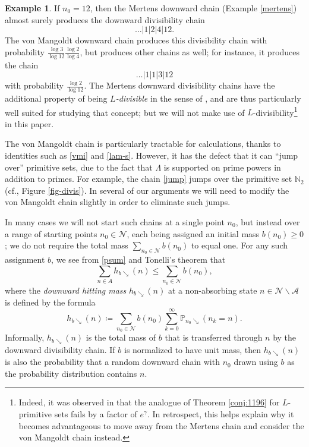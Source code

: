 \documentclass[12pt]{amsart}
\theoremstyle{definition}
\newtheorem{example}[theorem]{Example}
\theoremstyle{remark}
\numberwithin{equation}{section}
\newcommand{\N}{{\mathbb N}}
\newcommand{\1}{{\mathbf 1}}
\begin{document}
\begin{example}\label{chain-ex} If $n_0=12$, then the Mertens downward chain (Example \ref{mertens}) almost surely produces the downward divisibility chain
$$ \dots | 1 | 2 | 4 | 12.$$
The von Mangoldt downward chain produces this divisibility chain with probability $\frac{\log 3}{\log 12} \frac{\log 2}{\log 4}$, but produces other chains as well; for instance, it produces the chain
\begin{equation}\label{jump}
\dots | 1 | 1 | 3 | 12
\end{equation}
with probability $\frac{\log 2}{\log 12}$.  The Mertens downward divisibility chains have the additional property of being \emph{$L$-divisible} in the sense of \cite{Lichtman}, and are thus particularly well suited for studying that concept; but we will not make use of $L$-divisibility\footnote{Indeed, it was observed in \cite[Proposition 5.3]{Lichtman} that the analogue of Theorem \ref{conj:1196} for $L$-primitive sets fails by a factor of $e^\gamma$.  In retrospect, this helps explain why it becomes advantageous to move away from the Mertens chain and consider the von Mangoldt chain instead.} in this paper.  

The von Mangoldt chain is particularly tractable for calculations, thanks to identities such as \eqref{vmi} and \eqref{lam-s}.  However, it has the defect that it can ``jump over'' primitive sets, due to the fact that $\Lambda$ is supported on prime powers in addition to primes.  For example, the chain \eqref{jump} jumps over the primitive set $\N_2$ (cf., Figure \ref{fig-divis}).  In several of our arguments we will need to modify the von Mangoldt chain slightly in order to eliminate such jumps.
\end{example}

In many cases we will not start such chains at a single point $n_0$, but instead over a range of starting points $n_0 \in {\mathcal N}$, each being assigned an initial mass $b(n_0) \geq 0$; we do not require the total mass $\sum_{n_0 \in {\mathcal N}} b(n_0)$ to equal one.  For any such assignment $b$, we see from \eqref{psum} and Tonelli's theorem that
\begin{equation}\label{psum-weight}
\sum_{n \in A} h_{b\searrow}(n) \leq \sum_{n_0 \in {\mathcal N}} b(n_0),
\end{equation}
where the \emph{downward hitting mass} $h_{b\searrow}(n)$ at a non-absorbing state $n \in {\mathcal N} \backslash {\mathcal A}$ is defined by the formula
$$ h_{b\searrow}(n) \coloneq \sum_{n_0\in\mathcal N}b(n_0)\sum_{k=0}^\infty \mathbb{P}_{n_0\searrow}( n_k = n ).$$
Informally, $h_{b\searrow}(n)$ is the total mass of $b$ that is transferred through $n$ by the downward divisibility chain.  If $b$ is normalized to have unit mass, then $h_{b\searrow}(n)$ is also the probability that a random downward chain with $n_0$ drawn using $b$ as the probability distribution contains $n$.
\end{document}
